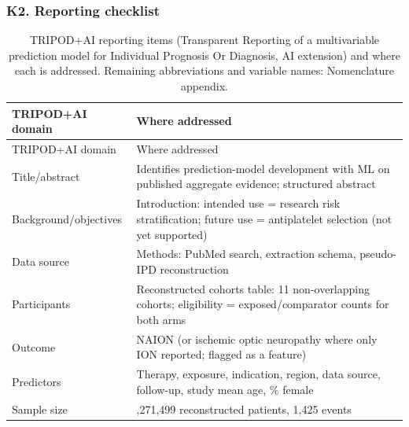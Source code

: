 \documentclass[
  11pt,
]{article}
\begin{document}
\subsubsection{K2. Reporting checklist}\label{k2.-reporting-checklist}

\begin{longtable}[]{@{}
  >{\raggedright\arraybackslash}p{}
  >{\raggedright\arraybackslash}p{}@{}}
\caption{TRIPOD+AI reporting items (Transparent Reporting of a
multivariable prediction model for Individual Prognosis Or Diagnosis, AI
extension) and where each is addressed. Remaining abbreviations and
variable names: Nomenclature appendix.}\tabularnewline
\toprule\noalign{}
\begin{minipage}[b]{\linewidth}\raggedright
TRIPOD+AI domain
\end{minipage} & \begin{minipage}[b]{\linewidth}\raggedright
Where addressed
\end{minipage} \\
\midrule\noalign{}
\endfirsthead
\toprule\noalign{}
\begin{minipage}[b]{\linewidth}\raggedright
TRIPOD+AI domain
\end{minipage} & \begin{minipage}[b]{\linewidth}\raggedright
Where addressed
\end{minipage} \\
\midrule\noalign{}
\endhead
\bottomrule\noalign{}
\endlastfoot
Title/abstract & Identifies prediction-model development with ML on
published aggregate evidence; structured abstract \\
Background/objectives & Introduction: intended use = research risk
stratification; future use = antiplatelet selection (not yet
supported) \\
Data source & Methods: PubMed search, extraction schema, pseudo-IPD
reconstruction \\
Participants & Reconstructed cohorts table: 11 non-overlapping cohorts;
eligibility = exposed/comparator counts for both arms \\
Outcome & NAION (or ischemic optic neuropathy where only ION reported;
flagged as a feature) \\
Predictors & Therapy, exposure, indication, region, data source,
follow-up, study mean age, \% female \\
Sample size & 3,271,499 reconstructed patients, 1,425 events \\

\end{longtable}
\end{document}
